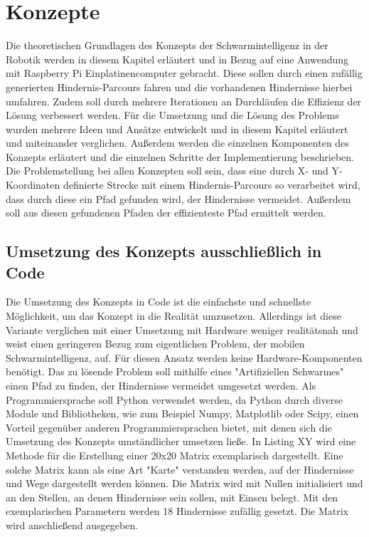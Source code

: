 \section{Konzepte}
Die theoretischen Grundlagen des Konzepts der Schwarmintelligenz in der Robotik werden in diesem Kapitel erläutert und in Bezug auf eine Anwendung mit Raspberry Pi Einplatinencomputer gebracht. Diese sollen durch einen zufällig generierten Hindernis-Parcours fahren und die vorhandenen Hindernisse hierbei umfahren. Zudem soll durch mehrere Iterationen an Durchläufen die Effizienz der Lösung verbessert werden. Für die Umsetzung und die Lösung des Problems wurden mehrere Ideen und Ansätze entwickelt und in diesem Kapitel erläutert und miteinander verglichen. Außerdem werden die einzelnen Komponenten des Konzepts erläutert und die einzelnen Schritte der Implementierung beschrieben. Die Problemstellung bei allen Konzepten soll sein, dass eine durch X- und Y-Koordinaten definierte Strecke mit einem Hindernis-Parcours so verarbeitet wird, dass durch diese ein Pfad gefunden wird, der Hindernisse vermeidet. Außerdem soll aus diesen gefundenen Pfaden der effizienteste Pfad ermittelt werden.

\subsection{Umsetzung des Konzepts ausschließlich in Code}
Die Umsetzung des Konzepts in Code ist die einfachste und schnellste Möglichkeit, um das Konzept in die Realität umzusetzen. Allerdings ist diese Variante verglichen mit einer Umsetzung mit Hardware weniger realitätsnah und weist einen geringeren Bezug zum eigentlichen Problem, der mobilen Schwarmintelligenz, auf. Für diesen Ansatz werden keine Hardware-Komponenten benötigt. Das zu lösende Problem soll mithilfe eines "Artifiziellen Schwarmes" einen Pfad zu finden, der Hindernisse vermeidet umgesetzt werden. Als Programmiersprache soll Python verwendet werden, da Python durch diverse Module und Bibliotheken, wie zum Beispiel Numpy, Matplotlib oder Scipy, einen Vorteil gegenüber anderen Programmiersprachen bietet, mit denen sich die Umsetzung des Konzepts umständlicher umsetzen ließe. In Listing XY wird eine Methode für die Erstellung einer 20x20 Matrix exemplarisch dargestellt. Eine solche Matrix kann als eine Art "Karte" verstanden werden, auf der Hindernisse und Wege dargestellt werden können. Die Matrix wird mit Nullen initialisiert und an den Stellen, an denen Hindernisse sein sollen, mit Einsen belegt. Mit den exemplarischen Parametern werden 18 Hindernisse zufällig gesetzt. Die Matrix wird anschließend ausgegeben.

